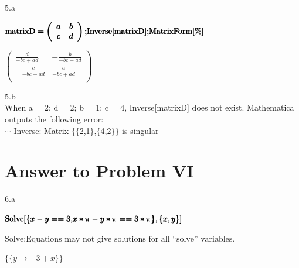 \documentclass[11pt,a4paper]{article}
\begin{document}
5.a\\
\begin{doublespace}
\noindent\(\pmb{\text{matrixD}=\left(
\begin{array}{cc}
 a & b \\
 c & d \\
\end{array}
\right);}\\
\pmb{\text{Inverse}[\text{matrixD}];}\\
\pmb{\text{MatrixForm}[\%]}\)
\end{doublespace}

\begin{doublespace}
\noindent\(\left(
\begin{array}{cc}
 \frac{d}{-b c+a d} & -\frac{b}{-b c+a d} \\
 -\frac{c}{-b c+a d} & \frac{a}{-b c+a d} \\
\end{array}
\right)\)
\end{doublespace}

5.b\\
When { }a = 2; d = 2; b = 1; c = 4, Inverse[matrixD] does not exist. Mathematica outputs the following error:\\
$\cdots $ Inverse: Matrix $\{\{$2,1$\}$,$\{$4,2$\}\}$ is singular

\clearpage
\section{Answer to Problem VI}\label{sec:P06}

6.a\\
\begin{doublespace}
\noindent\(\pmb{\text{Solve}[\{}\\
\pmb{x-y==3,}\\
\pmb{x*\pi -y*\pi ==3*\pi }\\
\pmb{\},\{x,y\}]}\)
\end{doublespace}

\noindent\(\text{Solve}: \text{Equations may not give solutions for all {``}solve{''} variables.}\)

\begin{doublespace}
\noindent\(\{\{y\to -3+x\}\}\)
\end{doublespace}
\end{document}
